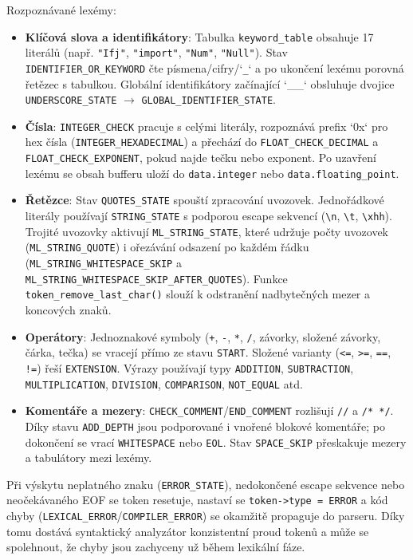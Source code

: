 \documentclass[a4paper,12pt]{article}
\begin{document}
Rozpoznávané lexémy:
\begin{itemize}
    \item \textbf{Klíčová slova a identifikátory}: Tabulka \texttt{keyword\_table} obsahuje 17 literálů (např. \texttt{"Ifj"}, \texttt{"import"}, \texttt{"Num"}, \texttt{"Null"}). Stav \texttt{IDENTIFIER\_OR\_KEYWORD} čte písmena/cifry/`\texttt{\_}` a po ukončení lexému porovná řetězec s tabulkou. Globální identifikátory začínající `\_\_` obsluhuje dvojice \texttt{UNDERSCORE\_STATE} $\rightarrow$ \texttt{GLOBAL\_IDENTIFIER\_STATE}.
    \item \textbf{Čísla}: \texttt{INTEGER\_CHECK} pracuje s celými literály, rozpoznává prefix `0x` pro hex čísla (\texttt{INTEGER\_HEXADECIMAL}) a přechází do \texttt{FLOAT\_CHECK\_DECIMAL} a \texttt{FLOAT\_CHECK\_EXPONENT}, pokud najde tečku nebo exponent. Po uzavření lexému se obsah bufferu uloží do \texttt{data.integer} nebo \texttt{data.floating\_point}.
    \item \textbf{Řetězce}: Stav \texttt{QUOTES\_STATE} spouští zpracování uvozovek. Jednořádkové literály používají \texttt{STRING\_STATE} s podporou escape sekvencí (\texttt{\textbackslash{}n}, \texttt{\textbackslash{}t}, \texttt{\textbackslash{}xhh}). Trojité uvozovky aktivují \texttt{ML\_STRING\_STATE}, které udržuje počty uvozovek (\texttt{ML\_STRING\_QUOTE}) i ořezávání odsazení po každém řádku (\texttt{ML\_STRING\_WHITESPACE\_SKIP} a \texttt{ML\_STRING\_WHITESPACE\_SKIP\_AFTER\_QUOTES}). Funkce \texttt{token\_remove\_last\_char()} slouží k odstranění nadbytečných mezer a koncových znaků.
    \item \textbf{Operátory}: Jednoznakové symboly (\texttt{+}, \texttt{-}, \texttt{*}, \texttt{/}, závorky, složené závorky, čárka, tečka) se vracejí přímo ze stavu \texttt{START}. Složené varianty (\texttt{<=}, \texttt{>=}, \texttt{==}, \texttt{!=}) řeší \texttt{EXTENSION}. Výrazy používají typy \texttt{ADDITION}, \texttt{SUBTRACTION}, \texttt{MULTIPLICATION}, \texttt{DIVISION}, \texttt{COMPARISON}, \texttt{NOT\_EQUAL} atd.
    \item \textbf{Komentáře a mezery}: \texttt{CHECK\_COMMENT}/\texttt{END\_COMMENT} rozlišují \texttt{//} a \texttt{/* */}. Díky stavu \texttt{ADD\_DEPTH} jsou podporované i vnořené blokové komentáře; po dokončení se vrací \texttt{WHITESPACE} nebo \texttt{EOL}. Stav \texttt{SPACE\_SKIP} přeskakuje mezery a tabulátory mezi lexémy.
\end{itemize}

Při výskytu neplatného znaku (\texttt{ERROR\_STATE}), nedokončené escape sekvence nebo neočekávaného EOF se token resetuje, nastaví se \texttt{token->type = ERROR} a kód chyby (\texttt{LEXICAL\_ERROR}/\texttt{COMPILER\_ERROR}) se okamžitě propaguje do parseru. Díky tomu dostává syntaktický analyzátor konzistentní proud tokenů a může se spolehnout, že chyby jsou zachyceny už během lexikální fáze.
\end{document}
